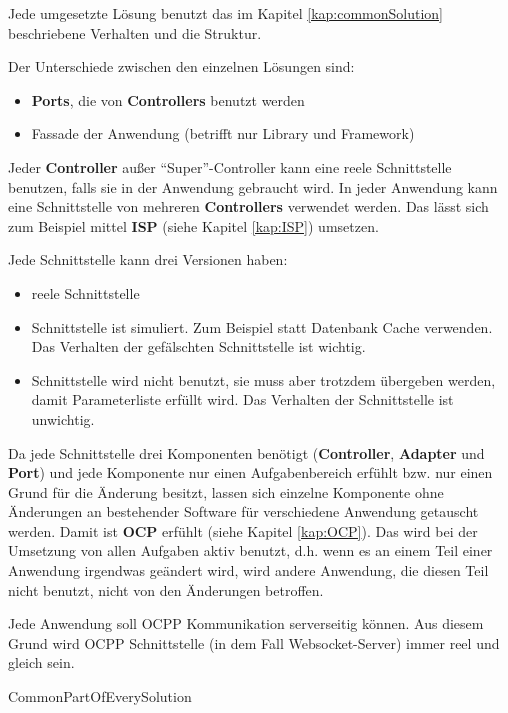 Jede umgesetzte Lösung benutzt das im Kapitel \ref{kap:commonSolution} beschriebene Verhalten 
und die Struktur. 

Der Unterschiede zwischen den einzelnen Lösungen sind:
\begin{itemize}
    \item \textbf{Ports}, die von \textbf{Controllers} benutzt werden
    \item Fassade der Anwendung (betrifft nur Library und Framework)
\end{itemize}

Jeder \textbf{Controller} außer ``Super''-Controller kann eine reele Schnittstelle benutzen, 
falls sie in der Anwendung gebraucht wird. In jeder Anwendung kann eine Schnittstelle von mehreren \textbf{Controllers} verwendet werden.
Das lässt sich zum Beispiel mittel \textbf{ISP} (siehe Kapitel \ref{kap:ISP}) umsetzen.

Jede Schnittstelle kann drei Versionen haben:
\begin{itemize}
    \item reele Schnittstelle
    \item Schnittstelle ist simuliert. Zum Beispiel statt Datenbank Cache verwenden. Das Verhalten der gefälschten Schnittstelle ist wichtig.
    \item Schnittstelle wird nicht benutzt, sie muss aber trotzdem übergeben werden, 
    damit Parameterliste erfüllt wird. Das Verhalten der Schnittstelle ist unwichtig.
\end{itemize}

Da jede Schnittstelle drei Komponenten benötigt (\textbf{Controller}, \textbf{Adapter} und \textbf{Port}) und jede Komponente nur einen Aufgabenbereich erfühlt
bzw. nur einen Grund für die Änderung besitzt, lassen sich einzelne Komponente ohne Änderungen an bestehender Software für verschiedene Anwendung getauscht werden. 
Damit ist \textbf{OCP} erfühlt (siehe Kapitel \ref{kap:OCP}). Das wird bei der Umsetzung von allen Aufgaben aktiv benutzt, d.h. wenn es an einem Teil einer Anwendung 
irgendwas geändert wird, wird andere Anwendung, die diesen Teil nicht benutzt, nicht von den Änderungen betroffen.

\newpage
Jede Anwendung soll OCPP Kommunikation serverseitig können. 
Aus diesem Grund wird OCPP Schnittstelle (in dem Fall Websocket-Server) immer reel und gleich sein.

{CommonPartOfEverySolution}